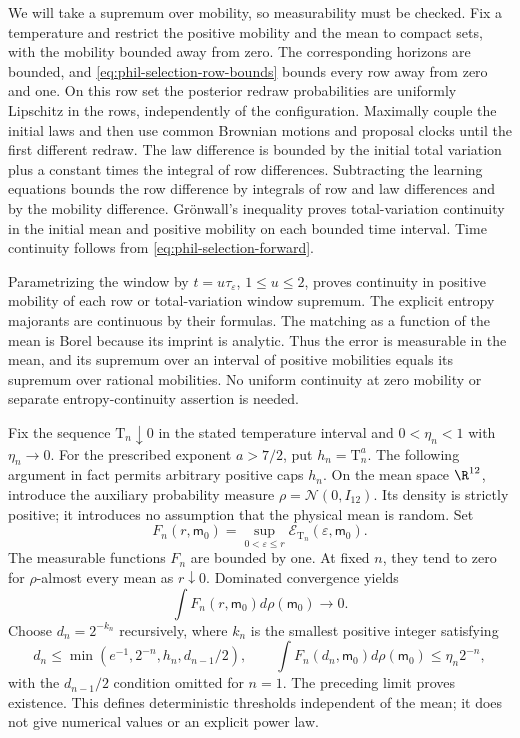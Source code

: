 We will take a supremum over mobility, so measurability must be checked.
Fix a temperature and restrict the positive mobility and the mean to
compact sets, with the mobility bounded away from zero. The corresponding
horizons are bounded, and
\cref{eq:phil-selection-row-bounds} bounds every row away from zero and
one. On this row set the posterior redraw probabilities are uniformly
Lipschitz in the rows, independently of the configuration.
Maximally couple the initial laws and then use common Brownian motions
and proposal clocks until the first different redraw. The law difference
is bounded by the initial total variation plus a constant times the
integral of row differences. Subtracting the learning equations bounds
the row difference by integrals of row and law differences and by the
mobility difference. Gr\"onwall's inequality proves total-variation
continuity in the initial mean and positive mobility on each bounded
time interval. Time continuity follows from
\cref{eq:phil-selection-forward}.

Parametrizing the window by \(t=u\tau_\varepsilon\),
\(1\le u\le2\), proves continuity in positive mobility of each row or
total-variation window supremum. The explicit entropy majorants are
continuous by their formulas. The matching as a function of the mean is
Borel because its imprint is analytic. Thus the error is measurable
in the mean, and its supremum over an interval of positive mobilities
equals its supremum over rational mobilities. No uniform continuity at
zero mobility or separate entropy-continuity assertion is needed.

Fix the sequence \(\mathrm T_n\downarrow0\) in the stated temperature
interval and \(0<\eta_n<1\) with \(\eta_n\to0\). For the prescribed
exponent \(a>7/2\), put \(h_n=\mathrm T_n^a\). The following argument
in fact permits arbitrary positive caps \(h_n\).
On the mean space \(\R^{12}\), introduce the auxiliary probability
measure \(\rho=\mathcal N(0,I_{12})\). Its density is strictly positive;
it introduces no assumption that the physical mean is random.
Set
\[
 F_n(r,\mathsf m_0)
 =\sup_{0<\varepsilon\le r}
       \mathcal E_{\mathrm T_n}(\varepsilon,\mathsf m_0).
\]
The measurable functions \(F_n\) are bounded by one. At fixed \(n\),
they tend to zero for \(\rho\)-almost every mean as \(r\downarrow0\).
Dominated convergence yields
\[
 \int F_n(r,\mathsf m_0)d\rho(\mathsf m_0)\longrightarrow0.
\]
Choose \(d_n=2^{-k_n}\) recursively, where \(k_n\) is the smallest
positive integer satisfying
\[
 d_n\le\min(e^{-1},2^{-n},h_n,d_{n-1}/2),
 \qquad
 \int F_n(d_n,\mathsf m_0)d\rho(\mathsf m_0)
       \le\eta_n2^{-n},
\]
with the \(d_{n-1}/2\) condition omitted for \(n=1\). The preceding
limit proves existence. This defines deterministic thresholds
independent of the mean; it does not give numerical values or an explicit
power law.

